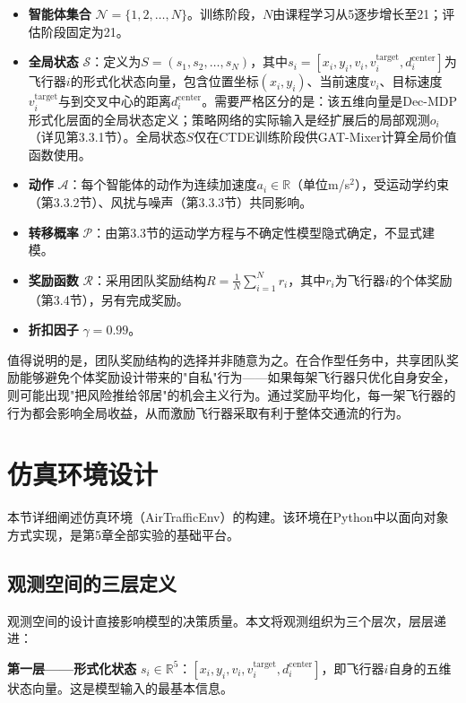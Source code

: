 \documentclass[12pt,a4paper,UTF8]{ctexbook}
\begin{document}
\begin{itemize}
    \item \textbf{智能体集合} $\mathcal{N} = \{1, 2, \ldots, N\}$。训练阶段，$N$由课程学习从5逐步增长至21；评估阶段固定为21。
    \item \textbf{全局状态} $\mathcal{S}$：定义为$S = (s_1, s_2, \ldots, s_N)$，其中$s_i = [x_i, y_i, v_i, v_i^{\text{target}}, d_i^{\text{center}}]$为飞行器$i$的形式化状态向量，包含位置坐标$(x_i,y_i)$、当前速度$v_i$、目标速度$v_i^{\text{target}}$与到交叉中心的距离$d_i^{\text{center}}$。需要严格区分的是：该五维向量是Dec-MDP形式化层面的全局状态定义；策略网络的实际输入是经扩展后的局部观测$o_i$（详见第3.3.1节）。全局状态$S$仅在CTDE训练阶段供GAT-Mixer计算全局价值函数使用。
    \item \textbf{动作} $\mathcal{A}$：每个智能体的动作为连续加速度$a_i \in \mathbb{R}$（单位m/s$^2$），受运动学约束（第3.3.2节）、风扰与噪声（第3.3.3节）共同影响。
    \item \textbf{转移概率} $\mathcal{P}$：由第3.3节的运动学方程与不确定性模型隐式确定，不显式建模。
    \item \textbf{奖励函数} $\mathcal{R}$：采用团队奖励结构$R = \frac{1}{N}\sum_{i=1}^{N} r_i$，其中$r_i$为飞行器$i$的个体奖励（第3.4节），另有完成奖励。
    \item \textbf{折扣因子} $\gamma = 0.99$。
\end{itemize}

值得说明的是，团队奖励结构的选择并非随意为之。在合作型任务中，共享团队奖励能够避免个体奖励设计带来的"自私"行为——如果每架飞行器只优化自身安全，则可能出现"把风险推给邻居"的机会主义行为。通过奖励平均化，每一架飞行器的行为都会影响全局收益，从而激励飞行器采取有利于整体交通流的行为。

\section{仿真环境设计}

本节详细阐述仿真环境（AirTrafficEnv）的构建。该环境在Python中以面向对象方式实现，是第5章全部实验的基础平台。

\subsection{观测空间的三层定义}

观测空间的设计直接影响模型的决策质量。本文将观测组织为三个层次，层层递进：

\textbf{第一层——形式化状态} $s_i \in \mathbb{R}^5$：$[x_i, y_i, v_i, v_i^{\text{target}}, d_i^{\text{center}}]$，即飞行器$i$自身的五维状态向量。这是模型输入的最基本信息。
\end{document}
